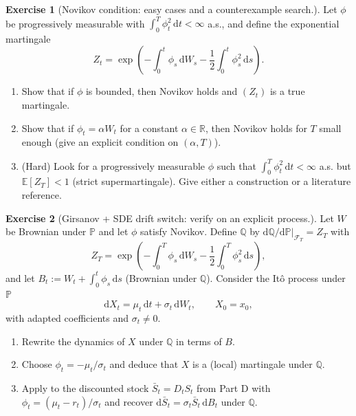 \documentclass[11pt]{article}
\newcommand{\E}{\mathbb{E}}
\newcommand{\R}{\mathbb{R}}
\newcommand{\F}{\mathcal{F}}
\newcommand{\1}{\mathbf{1}}
\theoremstyle{definition}
\newtheorem{exercise}{Exercise}[section]
\begin{document}
\begin{exercise}[Novikov condition: easy cases and a counterexample search.]
Let $\phi$ be progressively measurable with $\int_0^T \phi_t^2\,\mathrm{d} t<\infty$ a.s.,
and define the exponential martingale
$$
Z_t=\exp\!\left(-\int_0^t \phi_s\,\mathrm{d} W_s-\frac12\int_0^t \phi_s^2\,\mathrm{d} s\right).
$$
\begin{enumerate}[leftmargin=1.2em, label=(\alph*), itemsep=0.3em]
\item Show that if $\phi$ is bounded, then Novikov holds and $(Z_t)$ is a true martingale.
\item Show that if $\phi_t=\alpha W_t$ for a constant $\alpha\in\R$, then
Novikov holds for $T$ small enough (give an explicit condition on $(\alpha,T)$).
\item (Hard) Look for a progressively measurable $\phi$ such that $\int_0^T \phi_t^2\,\mathrm{d} t<\infty$ a.s.
but $\E[Z_T]<1$ (strict supermartingale). Give either a construction or a literature reference.
\end{enumerate}
\end{exercise}
\begin{exercise}[Girsanov + SDE drift switch: verify on an explicit process.]
Let $W$ be Brownian under $\mathbb{P}$ and let $\phi$ satisfy Novikov.
Define $\mathbb{Q}$ by $\mathrm{d}\mathbb{Q}/\mathrm{d}\mathbb{P}|_{\F_T}=Z_T$ with
$$
Z_T=\exp\!\left(-\int_0^T \phi_s\,\mathrm{d} W_s-\frac12\int_0^T \phi_s^2\,\mathrm{d} s\right),
$$
and let $B_t:=W_t+\int_0^t \phi_s\,\mathrm{d} s$ (Brownian under $\mathbb{Q}$).
Consider the It\^o process under $\mathbb{P}$
$$
\mathrm{d} X_t = \mu_t\,\mathrm{d} t + \sigma_t\,\mathrm{d} W_t,\qquad X_0=x_0,
$$
with adapted coefficients and $\sigma_t\neq 0$.
\begin{enumerate}[leftmargin=1.2em, label=(\alph*), itemsep=0.3em]
\item Rewrite the dynamics of $X$ under $\mathbb{Q}$ in terms of $B$.
\item Choose $\phi_t=-\mu_t/\sigma_t$ and deduce that $X$ is a (local) martingale under $\mathbb{Q}$.
\item Apply to the discounted stock $\bar S_t=D_tS_t$ from Part D with
$\phi_t=(\mu_t-r_t)/\sigma_t$ and recover $\mathrm{d}\bar S_t=\sigma_t \bar S_t\,\mathrm{d} B_t$ under $\mathbb{Q}$.
\end{enumerate}
\end{exercise}
\end{document}
